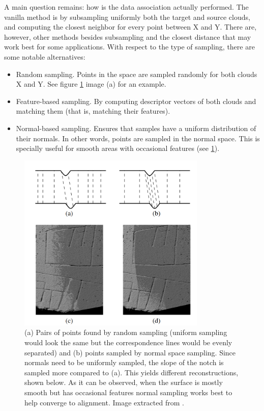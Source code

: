 \documentclass[../main.tex]{subfiles}
\begin{document}
A main question remains: how is the data association actually performed. The vanilla method is by subsampling uniformly both the target and source clouds, and computing the closest neighbor for every point between X and Y. There are, however, other methods besides subsampling and the closest distance that may work best for some applications. With respect to the type of sampling, there are some notable alternatives:
\begin{itemize}
    \item Random sampling. Points in the space are sampled randomly for both clouds X and Y. See figure \ref{fig:normal_sampling_icp} image (a) for an example.
    \item Feature-based sampling. By computing descriptor vectors of both clouds and matching them (that is, matching their features).
    \item Normal-based sampling. Ensures that samples have a uniform distribution of their normals. In other words, points are sampled in the normal space. This is specially useful for smooth areas with occasional features (see \ref{fig:normal_sampling_icp}).
\end{itemize}
\begin{figure}[htbp]
    \centering
    \includegraphics[width=0.8\textwidth]{images/normal_sampling_icp.png}
    \caption{(a) Pairs of points found by random sampling (uniform sampling would look the same but the correspondence lines would be evenly separated) and (b) points sampled by normal space sampling. Since normals need to be uniformly sampled, the slope of the notch is sampled more compared to (a). This yields different reconstructions, shown below. As it can be observed, when the surface is mostly smooth but has occasional features normal sampling works best to help converge to alignment. Image extracted from \cite{rusinkiewicz2001efficient_icps}.}
    \label{fig:normal_sampling_icp}
\end{figure}
\end{document}
